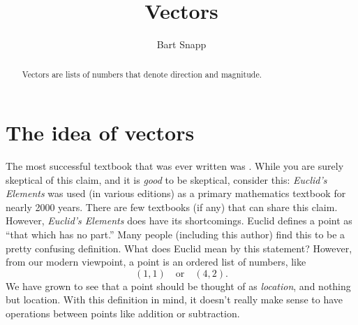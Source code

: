 \documentclass{ximera}
\author{Bart Snapp}
\title[Dig-In:]{Vectors}
\begin{document}
\begin{abstract}
  Vectors are lists of numbers that denote direction and magnitude.
\end{abstract}
\maketitle


\section{The idea of vectors}

The most successful textbook that was ever written was
. While
you are surely skeptical of this claim, and it is \textit{good} to be
skeptical, consider this: \textit{Euclid's Elements} was used (in
various editions) as a primary mathematics textbook for nearly 2000
years. There are few textbooks (if any) that can share this
claim. However, \textit{Euclid's Elements} does have its shortcomings. 
Euclid defines a point as ``that which has no part.'' Many people 
(including this author) find this to be 
a pretty confusing definition. What does Euclid mean by this statement? 
However, from our modern viewpoint, a point is an
ordered list of numbers, like
\[
(1,1)\quad\text{or}\quad(4,2).
\]
We have grown to see that a point should be thought of as
\textit{location}, and nothing but location. With this definition in mind, it
doesn't really make sense to have operations between points like
addition or subtraction.
\end{document}
